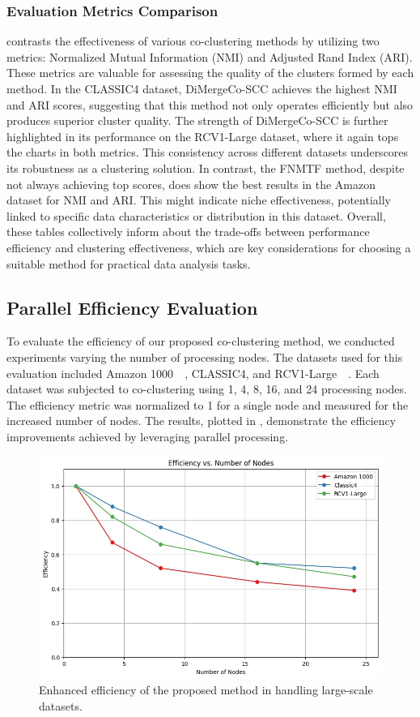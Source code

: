 \documentclass[journal]{IEEEtran}
\renewcommand{\cite}[1]{~\autocite{#1}}
\begin{document}
\subsubsection{Evaluation Metrics Comparison}
 contrasts the effectiveness of various co-clustering methods by utilizing two metrics: Normalized Mutual Information (NMI) and Adjusted Rand Index (ARI). These metrics are valuable for assessing the quality of the clusters formed by each method. In the CLASSIC4 dataset, DiMergeCo-SCC achieves the highest NMI and ARI scores, suggesting that this method not only operates efficiently but also produces superior cluster quality. The strength of DiMergeCo-SCC is further highlighted in its performance on the RCV1-Large dataset, where it again tops the charts in both metrics. This consistency across different datasets underscores its robustness as a clustering solution. In contrast, the FNMTF method, despite not always achieving top scores, does show the best results in the Amazon dataset for NMI and ARI. This might indicate niche effectiveness, potentially linked to specific data characteristics or distribution in this dataset. Overall, these tables collectively inform about the trade-offs between performance efficiency and clustering effectiveness, which are key considerations for choosing a suitable method for practical data analysis tasks.

\subsection{Parallel Efficiency Evaluation}
To evaluate the efficiency of our proposed co-clustering method, we conducted experiments varying the number of processing nodes. The datasets used for this evaluation included Amazon 1000~\cite{ni2019JustifyingRecommendationsUsing}, CLASSIC4, and RCV1-Large~\cite{lewis2004Rcv1NewBenchmark}. Each dataset was subjected to co-clustering using 1, 4, 8, 16, and 24 processing nodes. The efficiency metric was normalized to 1 for a single node and measured for the increased number of nodes. The results, plotted in , demonstrate the efficiency improvements achieved by leveraging parallel processing.

\begin{figure}[htbp]
    \centering
    \includegraphics[width=0.8\linewidth]{efficiency.jpg}
    \caption{Enhanced efficiency of the proposed method in handling large-scale datasets.}
    \label{fig:efficiency}
\end{figure}
\end{document}
